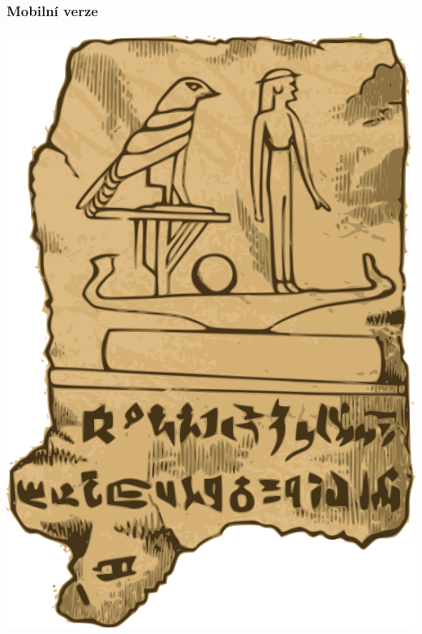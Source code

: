 \documentclass{beamer}
\begin{document}
\begin{frame}
\frametitle{Mobilní verze}
\begin{center}
\includegraphics[height=.7\paperheight]{j4p4n-egyption-tablet}
\end{center}
\end{frame}
\end{document}
